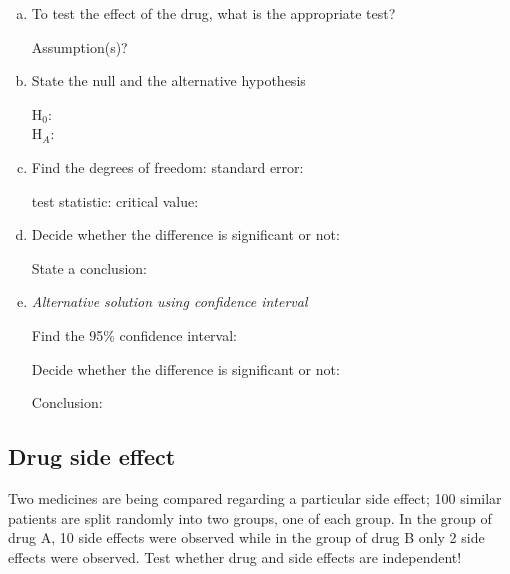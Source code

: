 \begin{enumerate}[a)]
	\item To test the effect of the drug, what is the appropriate test?\hrulefill

	Assumption(s)?\hrulefill

	\item 
	State the null and the alternative hypothesis
		
		H$_0$:	\hrulefill\\
		H$_A$:	\hrulefill

	\item Find the degrees of freedom: \hrulefill
		\quad
	standard error: \hrulefill


	test statistic: \hrulefill
		\quad
	critical value: \hrulefill

	\item Decide whether the difference is significant or not: \hrulefill


		State a conclusion: \hrulefill

	\item \emph{Alternative solution using confidence interval}

	Find the 95\% confidence interval: \hrulefill

	Decide whether the difference is significant or not: \hrulefill

	Conclusion: \hrulefill
\end{enumerate}


\subsection{Drug side effect}
Two medicines are being compared regarding a particular side effect; 100 similar patients are split randomly into two groups, one of each group. In the group of drug A, 10 side effects were observed while in the group of drug B only 2 side effects were observed. Test whether drug and side effects are independent!\bigskip

